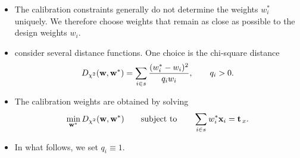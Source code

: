 \documentclass{my_eth_beamer}
\numberwithin{equation}{section}
\begin{document}
\begin{frame}
    \begin{itemize}
    \setlength{\itemsep}{10pt}
        \item The calibration constraints generally do not determine the
            weights $w_i^*$ uniquely. We therefore choose weights that remain
            \alert{as close as possible} to the design weights $w_i$.

        \item \citet{deville_sarndal_1992} consider several distance
            functions. One choice is the \alert{chi-square distance}
            \begin{equation*}
                D_{\chi^2}(\bold{w},\bold{w}^*)
                =
                \sum_{i\in s}
                \frac{(w_i^*-w_i)^2}{q_iw_i},
                \qquad q_i>0.
            \end{equation*}

        \item The calibration weights are obtained by solving
            \begin{equation*}
                \min_{\bold{w}^*}D_{\chi^2}(\bold{w},\bold{w}^*)
                \qquad\text{subject to}\qquad
                \sum_{i\in s}w_i^*\bold{x}_i=\bold{t}_{\,x}.
            \end{equation*}

        \item In what follows, we set $q_i\equiv1$.
    \end{itemize}
\end{frame}
\end{document}
